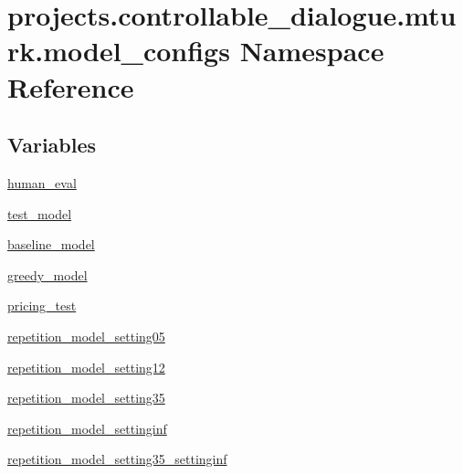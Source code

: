 \hypertarget{namespaceprojects_1_1controllable__dialogue_1_1mturk_1_1model__configs}{}\section{projects.\+controllable\+\_\+dialogue.\+mturk.\+model\+\_\+configs Namespace Reference}
\label{namespaceprojects_1_1controllable__dialogue_1_1mturk_1_1model__configs}
\subsection*{Variables}
\begin{DoxyCompactItemize}
\item 
\hyperlink{namespaceprojects_1_1controllable__dialogue_1_1mturk_1_1model__configs_a82e4350c2c31d1d06fd8d2f974c13f4b}{human\+\_\+eval}
\item 
\hyperlink{namespaceprojects_1_1controllable__dialogue_1_1mturk_1_1model__configs_ad8417fb8217a7de8fdecdb71f745fdd2}{test\+\_\+model}
\item 
\hyperlink{namespaceprojects_1_1controllable__dialogue_1_1mturk_1_1model__configs_a40b9ee7ac11c460651edbe296aa751eb}{baseline\+\_\+model}
\item 
\hyperlink{namespaceprojects_1_1controllable__dialogue_1_1mturk_1_1model__configs_a371ff8847d5c4f2c50cbc2899dcac9de}{greedy\+\_\+model}
\item 
\hyperlink{namespaceprojects_1_1controllable__dialogue_1_1mturk_1_1model__configs_a70f7f82a58e3560f8d1b58db0a1bd922}{pricing\+\_\+test}
\item 
\hyperlink{namespaceprojects_1_1controllable__dialogue_1_1mturk_1_1model__configs_a47e158a7547dc3a172504ffb3c088a7f}{repetition\+\_\+model\+\_\+setting05}
\item 
\hyperlink{namespaceprojects_1_1controllable__dialogue_1_1mturk_1_1model__configs_a49aeeda669c297f924321adb32e57f46}{repetition\+\_\+model\+\_\+setting12}
\item 
\hyperlink{namespaceprojects_1_1controllable__dialogue_1_1mturk_1_1model__configs_a18f1dc080434fb2da19d6bee2586d65b}{repetition\+\_\+model\+\_\+setting35}
\item 
\hyperlink{namespaceprojects_1_1controllable__dialogue_1_1mturk_1_1model__configs_ad51fc230bcb72ab6c7a97af476ca08b6}{repetition\+\_\+model\+\_\+settinginf}
\item 
\hyperlink{namespaceprojects_1_1controllable__dialogue_1_1mturk_1_1model__configs_aa39819ffb7923edac36561341335fe2d}{repetition\+\_\+model\+\_\+setting35\+\_\+settinginf}

\end{DoxyCompactItemize}
